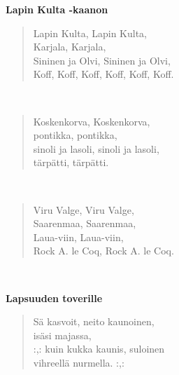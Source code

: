 %
%
\noindent\begin{minipage}{\linewidth}
\vspace{5pt}
\parbox[t]{0.85\linewidth}{\raggedright {\large\bf Lapin Kulta -kaanon}\\[6pt]}
\begin{verse}
	Lapin Kulta, Lapin Kulta,\\
	Karjala, Karjala,\\
	Sininen ja Olvi, Sininen ja Olvi,\\
	Koff, Koff, Koff, Koff, Koff, Koff.\\
\end{verse}
\end{minipage}\\[10pt]
\noindent\begin{minipage}{\linewidth}
\begin{verse}
	Koskenkorva, Koskenkorva,\\
	pontikka, pontikka,\\
	sinoli ja lasoli, sinoli ja lasoli,\\
	tärpätti, tärpätti.\\
\end{verse}
\end{minipage}\\[10pt]
\noindent\begin{minipage}{\linewidth}
\begin{verse}
	Viru Valge, Viru Valge,\\
	Saarenmaa, Saarenmaa,\\
	Laua-viin, Laua-viin,\\
	Rock A. le Coq, Rock A. le Coq.\\
\end{verse}
\end{minipage}\\[10pt]
%
%
\noindent\begin{minipage}{\linewidth}
\vspace{5pt}
\parbox[t]{0.85\linewidth}{\raggedright {\large\bf Lapsuuden toverille}\\[6pt]}
\begin{verse}
	Sä kasvoit, neito kaunoinen,\\
	isäsi majassa,\\
	\hspace{0pt-\widthof{:,: }}:,: kuin kukka kaunis, suloinen\\
	vihreellä nurmella. :,:\\
\end{verse}
\end{minipage}\\[10pt]
